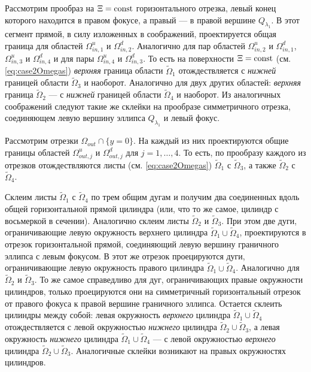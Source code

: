 Рассмотрим прообраз на $\Xi = \mathrm{const}$ горизонтального отрезка, левый конец которого находится в правом фокусе, а правый --- в правой вершине $Q_{\lambda_1}$.
В этот сегмент прямой, в силу изложенных в \cite[\S 4]{Fok15} соображений, проектируется общая граница для областей $\Omega_{in, 1}^u$ и $\Omega_{in, 2}^d$. Аналогично для пар областей $\Omega_{in, 2}^u$ и $\Omega_{in, 1}^d$, $\Omega_{in, 3}^u$ и $\Omega_{in, 4}^d$ и для пары $\Omega_{in, 4}^u$ и $\Omega_{in, 3}^d$. 
То есть на поверхности $\Xi = \mathrm{const}$ (см. \eqref{eq:case2Omegas}) \textit{верхняя} граница области $\widetilde{\Omega}_1$ отождествляется с \textit{нижней} границей области $\widetilde{\Omega}_3$ и наоборот. Аналогично для двух других областей: \textit{верхняя} граница $\widetilde{\Omega}_2$ --- с \textit{нижней} границей области $\widetilde{\Omega}_4$ и наоборот. 
Из аналогичных соображений следуют такие же склейки на прообразе симметричного отрезка, соединяющем левую вершину эллипса $Q_{\lambda_1}$ и левый фокус.

Рассмотрим отрезки $\Omega_{out} \cap \{y=0\}$. 
На каждый из них проектируются общие границы областей $\Omega_{out, j}^u$ и $\Omega_{out, j}^d$ для $j=1, \ldots, 4$. 
То есть, по прообразу каждого из отрезков отождествляются листы (см. \eqref{eq:case2Omegas}) $\widetilde{\Omega}_1$ с $\widetilde{\Omega}_3$, а также $\widetilde{\Omega}_2$ с  $\widetilde{\Omega}_4$.

Склеим листы $\widetilde{\Omega}_1$ с $\widetilde{\Omega}_4$ по трем общим дугам и получим два соединенных вдоль общей горизонтальной прямой цилиндра (или, что то же самое, цилиндр с восьмеркой в сечении). Аналогично склеим листы $\widetilde{\Omega}_2$ и $\widetilde{\Omega}_3$.
При этом две дуги, ограничивающие левую окружность верхнего цилиндра $\widetilde{\Omega}_1 \cup \widetilde{\Omega}_4$, проектируются в отрезок горизонтальной прямой, соединяющий левую вершину граничного эллипса с левым фокусом. В этот же отрезок проецируются дуги, ограничивающие левую окружность правого цилиндра  $\widetilde{\Omega}_1 \cup \widetilde{\Omega}_4$. Аналогично для $\widetilde{\Omega}_2$ и $\widetilde{\Omega}_3$. То же самое справедливо для дуг, ограничивающих правые окружности цилиндров, только проецируются они на симметричный горизонтальный отрезок от правого фокуса к правой вершине граничного эллипса.
Остается склеить цилиндры между собой: левая окружность \textit{верхнего} цилиндра $\widetilde{\Omega}_1 \cup \widetilde{\Omega}_4$ отождествляется с левой окружностью \textit{нижнего} цилиндра $\widetilde{\Omega}_2 \cup \widetilde{\Omega}_3$, а левая окружность \textit{нижнего} цилиндра $\widetilde{\Omega}_1 \cup \widetilde{\Omega}_4$ --- с левой окружностью \textit{верхнего} цилиндра $\widetilde{\Omega}_2 \cup \widetilde{\Omega}_3$. 
Аналогичные склейки возникают на правых окружностях цилиндров. 

